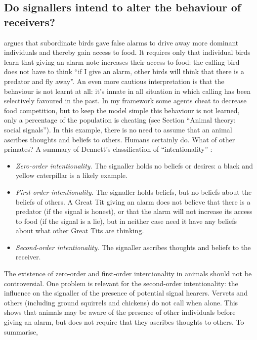 \subsection{Do signallers intend to alter the behaviour of receivers?}
\label{TheoryOfMind}
\citet{Moller1998:FalseAlarmCalls} argues that subordinate birds gave false alarms to drive away more dominant
individuals and thereby gain access to food. It requires only that individual birds learn that
giving an alarm note increases their access to food: the calling bird does not
have to think ``if I give an alarm, other birds will think that there is a predator and fly away''.
An even more cautious interpretation is that the behaviour is not learnt at all:
it's innate in all situation in which calling has been selectively favoured in the past.
In my framework some agents cheat to decrease food competition, but to keep the model
simple this behaviour is not learned, only a percentage of the population is
cheating (see Section ``Animal theory: social signals''). In this example,
there is no need to assume that an animal ascribes thoughts and beliefs to others.
Humans certainly do. What of other primates?
A summary of Dennett's classification of ``intentionality'' \citep{Dennett1987:Intentional}:
\begin{itemize}
 \item \textit{Zero-order intentionality.} The signaller holds no beliefs or desires:
 a black and yellow caterpillar is a likely example.
 \item \textit{First-order intentionality.} The signaller holds beliefs,
but no beliefs about the beliefs of others.
A Great Tit giving an alarm does not believe that there is a predator (if the signal is honest),
or that the alarm will not increase its access to food (if the signal is a lie),
but in neither case need it have any beliefs about what other Great Tits are thinking.
 \item \textit{Second-order intentionality.}  The signaller ascribes thoughts and beliefs to the receiver.
\end{itemize}
The existence of zero-order and first-order intentionality in animals
should not be controversial. One problem is relevant for the second-order intentionality:
the influence on the signaller of the presence of potential signal hearers.
Vervets and others (including ground squirrels and chickens) do not call when alone.
This shows that animals may be aware of the presence of other individuals before giving an
alarm, but does not require that they ascribes thoughts to others. To summarise,
